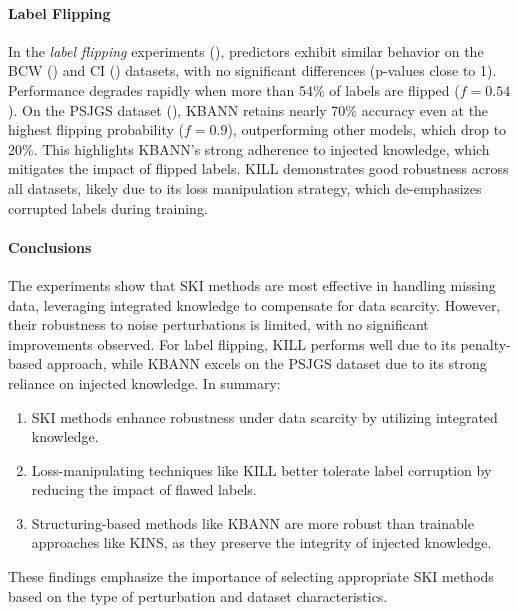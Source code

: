 \paragraph{Label Flipping}
%
In the \emph{label flipping} experiments (), predictors exhibit similar behavior on the \gls{BCW} () and \gls{CI} () datasets, with no significant differences (p-values close to 1).
%
Performance degrades rapidly when more than 54\% of labels are flipped (\(f = 0.54\)).
%
On the \gls{PSJGS} dataset (), \gls{KBANN} retains nearly 70\% accuracy even at the highest flipping probability (\(f = 0.9\)), outperforming other models, which drop to 20\%.
%
This highlights \gls{KBANN}'s strong adherence to injected knowledge, which mitigates the impact of flipped labels.
%
\gls{KILL} demonstrates good robustness across all datasets, likely due to its loss manipulation strategy, which de-emphasizes corrupted labels during training.


\paragraph{Conclusions}
%
The experiments show that \gls{SKI} methods are most effective in handling missing data, leveraging integrated knowledge to compensate for data scarcity.
%
However, their robustness to noise perturbations is limited, with no significant improvements observed.
%
For label flipping, \gls{KILL} performs well due to its penalty-based approach, while \gls{KBANN} excels on the \gls{PSJGS} dataset due to its strong reliance on injected knowledge.
%
In summary:
%
\begin{enumerate}
    \item \gls{SKI} methods enhance robustness under data scarcity by utilizing integrated knowledge.
    \item Loss-manipulating techniques like \gls{KILL} better tolerate label corruption by reducing the impact of flawed labels.
    \item Structuring-based methods like \gls{KBANN} are more robust than trainable approaches like \gls{KINS}, as they preserve the integrity of injected knowledge.
\end{enumerate}
%
These findings emphasize the importance of selecting appropriate \gls{SKI} methods based on the type of perturbation and dataset characteristics.